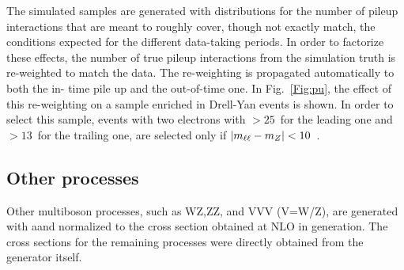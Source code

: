 The simulated samples are generated with distributions for the number of pileup interactions
that are meant to roughly cover, though not exactly match, the conditions expected for the
different data-taking periods. 
In order to factorize these effects, the number of true pileup interactions from the simulation truth is re-weighted to match the data. 
The re-weighting is propagated automatically to both the in-
time pile up and the out-of-time one.
In Fig.~\ref{Fig:pu}, the effect of this re-weighting on a sample enriched in Drell-Yan events is shown.
In order to select this sample, 
events with two electrons with \pt$> 25$~\GeV for the leading one and  \pt$>
13$~\GeV for the trailing one, are selected only if  $|m_{\ell\ell} - m_Z| < 10$~\GeV. 

\subsection*{Other processes} Other multiboson processes, such as WZ,ZZ, and VVV (V=W/Z), are generated with a\MCATNLO and normalized
to the cross section obtained at NLO in generation.
The cross sections for the remaining processes were directly obtained from the generator itself.



